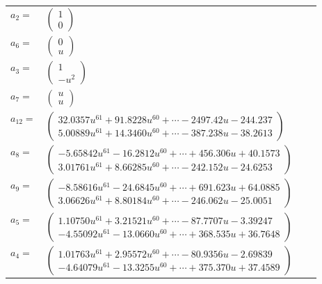 \documentclass[1p]{elsarticle_modified}
\theoremstyle{definition}
\begin{document}
\begin{tabular}{m{7pt} m{180pt} m{7pt} m{180pt} }
\flushright $a_{2}=$&$\begin{pmatrix}1\\0\end{pmatrix}$ \\
\flushright $a_{6}=$&$\begin{pmatrix}0\\u\end{pmatrix}$ \\
\flushright $a_{3}=$&$\begin{pmatrix}1\\- u^2\end{pmatrix}$ \\
\flushright $a_{7}=$&$\begin{pmatrix}u\\u\end{pmatrix}$ \\
\flushright $a_{12}=$&$\begin{pmatrix}32.0357 u^{61}+91.8228 u^{60}+\cdots-2497.42 u-244.237\\5.00889 u^{61}+14.3460 u^{60}+\cdots-387.238 u-38.2613\end{pmatrix}$ \\
\flushright $a_{8}=$&$\begin{pmatrix}-5.65842 u^{61}-16.2812 u^{60}+\cdots+456.306 u+40.1573\\3.01761 u^{61}+8.66285 u^{60}+\cdots-242.152 u-24.6253\end{pmatrix}$ \\
\flushright $a_{9}=$&$\begin{pmatrix}-8.58616 u^{61}-24.6845 u^{60}+\cdots+691.623 u+64.0885\\3.06626 u^{61}+8.80184 u^{60}+\cdots-246.062 u-25.0051\end{pmatrix}$ \\
\flushright $a_{5}=$&$\begin{pmatrix}1.10750 u^{61}+3.21521 u^{60}+\cdots-87.7707 u-3.39247\\-4.55092 u^{61}-13.0660 u^{60}+\cdots+368.535 u+36.7648\end{pmatrix}$ \\
\flushright $a_{4}=$&$\begin{pmatrix}1.01763 u^{61}+2.95572 u^{60}+\cdots-80.9356 u-2.69839\\-4.64079 u^{61}-13.3255 u^{60}+\cdots+375.370 u+37.4589\end{pmatrix}$ \\

\end{tabular}
\end{document}
